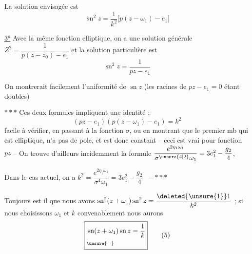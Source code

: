 La solution envisagée est
\[
\boxed{\operatorname{sn}^2 z=\frac{1}{k^2}\bigl[p(z-\omega_1)-e_1\bigr]} \tag*{(3)}
\]

\uline{3°} Avec la même fonction elliptique, on a une solution générale $Z^2=\dfrac{1}{p(z-z_0)-e_1}$ et la solution particulière est
\[
\boxed{\operatorname{sn}^2 z=\frac{1}{pz-e_1}} \tag*{(4)}
\]

On montrerait facilement l'uniformité de  $\operatorname{sn}z$ (les racines de $pz-e_1=0$ étant doubles)

$\ast\ast\ast$ Ces deux formules impliquent une identité :
\[
(pz-e_1)(p(z-\omega_1)-e_1)=k^2
\]
facile à vérifier, en passant à la fonction $\sigma$, ou en montrant que le premier mb qui est elliptique, n'a pas de pole, et est donc constant -- ceci est vrai pour  fonction $pz$ -- On trouve d'ailleurs incidemment la formule $\dfrac{e^{2\eta_1\omega_1}}{\sigma^{\unsure{4|2}}\omega_1}=3e_1^2-\dfrac{g_2}{4}$, 

Dans le cas actuel, on a $k^2=\dfrac{e^{2\eta_1\omega_1}}{\sigma^4\omega_1}=3e_1^2-\dfrac{g_2}{4}$ $\,-\ast\ast\ast$

Toujours est il que nous avons $\operatorname{sn}^2(z+\omega_1)\operatorname{sn}^2z=\dfrac{\deleted{\unsure{1}}1}{k^2}$ ; si nous choisissons $\omega_1$ et $k$ convenablement nous aurons
\[
\boxed{\begin{aligned}
&\operatorname{sn}(z+\omega_1)\operatorname{sn}z=\frac{1}{k}\\[-.5ex]
&\scriptstyle\unsure{=}
\end{aligned}} \tag*{(5)}
\]
\endgroup
